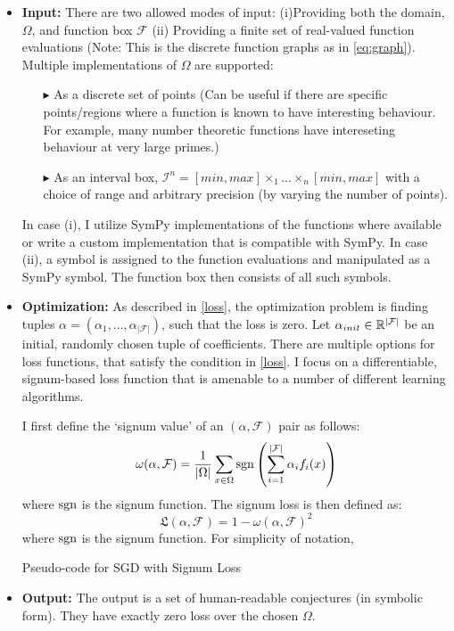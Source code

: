 \begin{itemize}
    \item 
        \textbf{Input:} There are two allowed modes of input: (i)Providing both the domain, $\Omega$, and function box $\mathcal{F}$ (ii) Providing a finite set of real-valued function evaluations (Note: This is the discrete function graphs as in \ref{eq:graph}). Multiple implementations of $\Omega$ are supported: 
          \begin{itemize}
            \item[$\blacktriangleright$] As a discrete set of points (Can be useful if there are specific points/regions where a function is known to have interesting behaviour. For example, many number theoretic functions have intereseting behaviour at very large primes.)
            \item[$\blacktriangleright$] As an interval box, $\mathcal{I}^n = [min, max]\times_1...\times_n[min, max]$ with a choice of range and arbitrary precision (by varying the number of points).
          \end{itemize}
          In case (i), I utilize SymPy \cite{10.7717/peerj-cs.103} implementations of the functions where available or write a custom implementation that is compatible with SymPy. In case (ii), a symbol is assigned to the function evaluations and manipulated as a SymPy symbol. The function box then consists of all such symbols.
    \item 
        \textbf{Optimization:} As described in \ref{loss}, the optimization problem is finding tuples $\alpha = (\alpha_1,...,\alpha_{|\mathcal{F}|})$, such that the loss is zero. Let $\alpha_{init}\in\mathbb{R}^{|\mathcal{F}|}$ be an initial, randomly chosen tuple of coefficients.
        There are multiple options for loss functions, that satisfy the condition in \ref{loss}. I focus on a differentiable, signum-based loss function that is amenable to a number of different learning algorithms.
        \begin{definition}
            \label{def:signum-loss}
            I first define the `signum value' of an $(\alpha, \mathcal{F})$ pair as follows:
            \begin{equation*}
                \omega(\alpha, \mathcal{F}) = \frac{1}{|\Omega|}\sum_{x\in\Omega} \operatorname{sgn}\left(\sum_{i=1}^{|\mathcal{F}|}\alpha_i f_i(x)\right)
            \end{equation*}
            where $\operatorname{sgn}$ is the signum function. The signum loss is then defined as:
            \begin{equation*}
                \mathfrak{L}(\alpha,\mathcal{F}) = 1 - \omega(\alpha, \mathcal{F})^2
            \end{equation*}
            where $\operatorname{sgn}$ is the signum function. For simplicity of notation,
        \end{definition}
        \begin{algorithm}
        \caption{Pseudo-code for SGD with Signum Loss}\label{alg:SGD}
        \end{algorithm}   
    \item 
        \textbf{Output:} The output is a set of human-readable conjectures (in symbolic form). They have exactly zero loss over the chosen $\Omega$.
    

\end{itemize}
